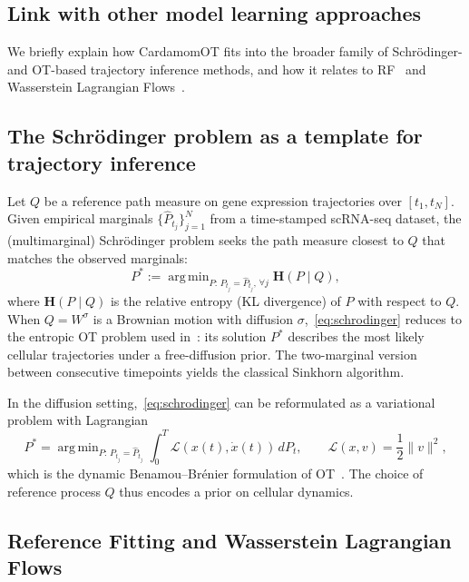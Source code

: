 \documentclass[a4paper, 11pt]{article}
\DeclareMathOperator*{\argmin}{arg\,min}
\theoremstyle{plain}
\theoremstyle{remark}
\newcommand*{\firstreview}[1]{{\color{black}#1}}
\begin{document}
\begin{appendices}
\section{Link with other model learning approaches}
\label{supp_OT}

We briefly explain how CardamomOT fits into the broader family of Schrödinger- and OT-based trajectory inference methods, and how it relates to \firstreview{RF}~\cite{zhang2024joint} and Wasserstein Lagrangian Flows~\cite{neklyudov2023computational}.

\subsection{The Schrödinger problem as a template for trajectory inference}

Let $Q$ be a reference path measure on gene expression trajectories over $[t_1, t_N]$. Given empirical marginals $\{\hat{P}_{t_j}\}_{j=1}^N$ from a time-stamped scRNA-seq dataset, the (multimarginal) Schrödinger problem seeks the path measure closest to $Q$ that matches the observed marginals:
\begin{equation}
\label{eq:schrodinger}
P^* := \argmin_{P :\, P_{t_j} = \hat{P}_{t_j},\, \forall j}
\mathbf{H}(P \mid Q),
\end{equation}
where $\mathbf{H}(P\mid Q)$ is the relative entropy (KL divergence) of $P$ with respect to $Q$. When $Q = W^\sigma$ is a Brownian motion with diffusion $\sigma$,~\eqref{eq:schrodinger} reduces to the entropic OT problem used in~\cite{schiebinger2019optimal}: its solution $P^*$ describes the most likely cellular trajectories under a free-diffusion prior. The two-marginal version between consecutive timepoints yields the classical Sinkhorn algorithm.

In the diffusion setting,~\eqref{eq:schrodinger} can be reformulated as a variational problem with Lagrangian
\begin{equation}
\label{eq:Benamou}
P^* = \argmin_{P:\, P_{t_j} = \hat{P}_{t_j}}
\int_0^T \mathcal{L}(x(t), \dot{x}(t))\,dP_t,
\qquad
\mathcal{L}(x,v) = \frac{1}{2}\|v\|^2,
\end{equation}
which is the dynamic Benamou–Brénier formulation of OT~\cite{leonard2012schrodinger}. The choice of reference process $Q$ thus encodes a prior on cellular dynamics.

\subsection{Reference Fitting and Wasserstein Lagrangian Flows}


\end{appendices}
\end{document}
